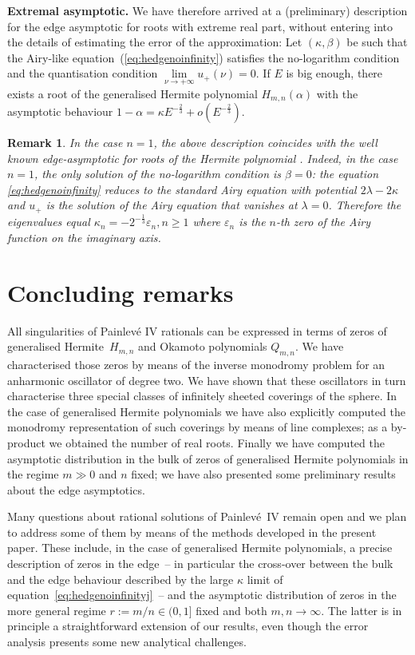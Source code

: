 \documentclass[pdftex]{sigma}
\numberwithin{equation}{section}
\newtheorem{rem*}[thm]{Remark}
\newcommand{\e}{\varepsilon}
\newcommand{\la}{\lambda}
\newcommand{\al}{\alpha}
\begin{document}
{\bf Extremal asymptotic.} We have therefore arrived at a (preliminary) description for the edge asymptotic for roots with extreme real part,
without entering into the details of estimating the error of the approximation: Let $(\kappa,\beta)$ be such that the Airy-like equation~(\ref{eq:hedgenoinfinity}) satisf\/ies the no-logarithm condition and the quantisation condition $\lim\limits_{\nu \to + \infty} u_+(\nu) =0$. If $E$ is big enough, there exists a root of
the generalised Hermite polynomial $H_{m,n}(\alpha)$ with the asymptotic behaviour $1-\al=\kappa E^{-\frac23}+o(E^{-\frac23})$.

\begin{rem*}
	In the case $n=1$, the above description coincides with the well known edge-asymptotic for roots of the Hermite polynomial \cite{bateman2}.	
	Indeed, in the case $n=1$, the only solution of the no-logarithm condition is $\beta=0$: the equation \eqref{eq:hedgenoinfinity}
	reduces to the standard Airy equation with potential $2\la-2\kappa$ and $u_+$ is the solution of the Airy equation
	that vanishes at $\la=0$. Therefore the eigenvalues equal $\kappa_n=-2^{-\frac13}\e_n, n \geq 1$ where
	$\e_n$ is the $n$-th zero of the Airy function on the imaginary axis.
\end{rem*}

\section{Concluding remarks}
All singularities of Painlev\'e IV rationals can be expressed in terms of zeros of generalised Hermite~$H_{m,n}$
and Okamoto polynomials $Q_{m,n}$. We have characterised those zeros by means of the inverse monodromy problem for an anharmonic
oscillator of degree two. We have shown that these oscillators in turn characterise three special classes of
inf\/initely sheeted coverings of the sphere. In the case of generalised Hermite polynomials we have also explicitly computed the
monodromy representation of such coverings by means of line complexes; as a by-product we obtained the number of real roots.
Finally we have computed the asymptotic distribution in the bulk of zeros of
generalised Hermite polynomials in the regime $m\gg0$ and $n$ f\/ixed; we have also presented some preliminary results
about the edge asymptotics.

Many questions about rational solutions of Painlev\'e~IV remain open and we plan to address
some of them by means of the methods developed in the present paper.
These include, in the case of generalised Hermite polynomials,
a precise description of zeros in the edge~-- in particular the cross-over between the bulk and the edge behaviour described by the
large $\kappa$ limit of equation~\eqref{eq:hedgenoinfinityj}~-- and the asymptotic distribution of zeros in the more general regime
$r:=m/n\in (0,1]$ f\/ixed and both $m,n\rightarrow \infty$.
The latter is in principle a straightforward extension of our results,
even though the error analysis presents some new analytical challenges.
\end{document}
